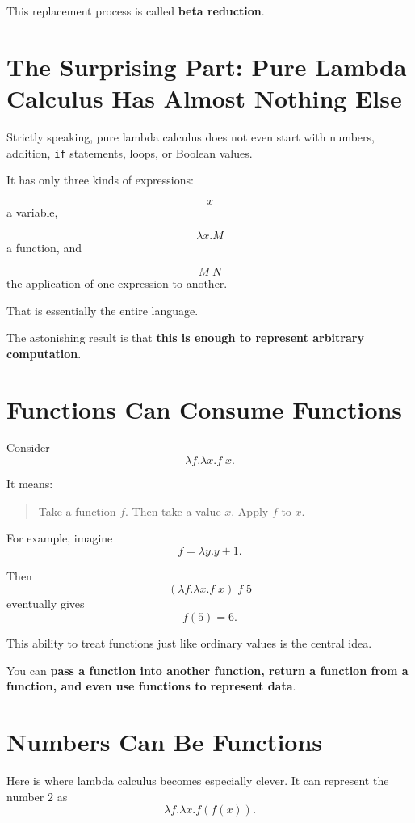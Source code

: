 \documentclass[11pt]{article}
\begin{document}
This replacement process is called \textbf{beta reduction}.

\section{The Surprising Part: Pure Lambda Calculus Has Almost Nothing Else}

Strictly speaking, pure lambda calculus does not even start with
numbers, addition, \texttt{if} statements, loops, or Boolean values.

It has only three kinds of expressions:

\[
\boxed{x}
\]
a variable,

\[
\boxed{\lambda x.M}
\]
a function, and

\[
\boxed{M\;N}
\]
the application of one expression to another.

That is essentially the entire language.

The astonishing result is that \textbf{this is enough to represent
arbitrary computation}.

\section{Functions Can Consume Functions}

Consider
\[
\lambda f.\lambda x.f\;x.
\]

It means:

\begin{quote}
Take a function \(f\). Then take a value \(x\). Apply \(f\) to \(x\).
\end{quote}

For example, imagine
\[
f=\lambda y.y+1.
\]

Then
\[
(\lambda f.\lambda x.f\;x)\;f\;5
\]
eventually gives
\[
f(5)=6.
\]

This ability to treat functions just like ordinary values is the
central idea.

You can \textbf{pass a function into another function, return a
function from a function, and even use functions to represent data}.

\section{Numbers Can Be Functions}

Here is where lambda calculus becomes especially clever. It can
represent the number \(2\) as
\[
\lambda f.\lambda x.f(f(x)).
\]
\end{document}
